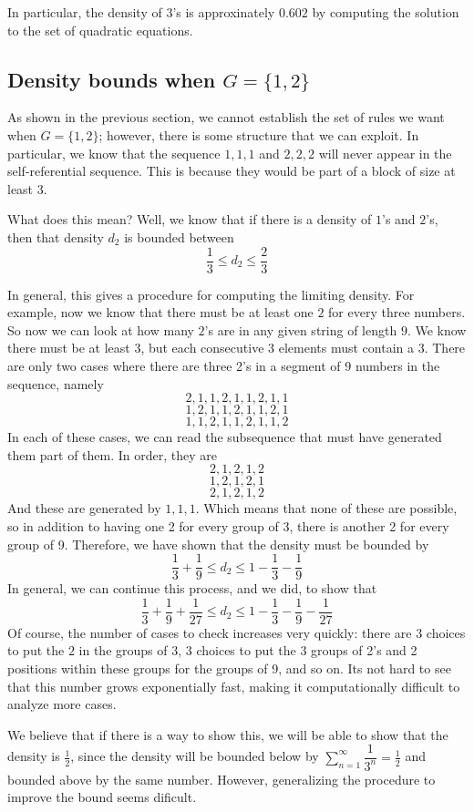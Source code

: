 \documentclass[runningheads,a4paper]{llncs}
\begin{document}
In particular, the density of 3's is approxinately $0.602$ by computing the solution to the set of quadratic equations.

\subsection{Density bounds when $G = \{1, 2\}$}

As shown in the previous section, we cannot establish the set of rules we want when $G = \{1 , 2\}$; however, there is some structure that we can exploit. In particular, we know that the sequence $1, 1, 1$ and $2, 2, 2$ will never appear in the self-referential sequence. This is because they would be part of a block of size at least $3$. 

What does this mean? Well, we know that if there is a density of $1$'s and $2$'s, then that density $d_2$ is bounded between 
\[ \dfrac{1}{3} \leq d_2 \leq \dfrac{2}{3} \]

In general, this gives a procedure for computing the limiting density. For example, now we know that there must be at least one $2$ for every three numbers. So now we can look at how many $2$'s are in any given string of length $9$. We know there must be at least $3$, but each consecutive $3$ elements must contain a $3$. There are only two cases where there are three 2's in a segment of $9$ numbers in the sequence, namely
\[ 2, 1, 1, 2, 1, 1 ,2 , 1, 1 \]
\[ 1, 2, 1, 1, 2, 1, 1, 2, 1 \]
\[ 1, 1, 2, 1, 1, 2, 1, 1, 2 \]
In each of these cases, we can read the subsequence that must have generated them part of them. In order, they are
\[ 2, 1, 2, 1, 2 \]
\[ 1, 2, 1, 2, 1\]
\[ 2, 1, 2, 1, 2 \]
And these are generated by $1, 1, 1$. Which means that none of these are possible, so in addition to having one 2 for every group of 3, there is another 2 for every group of 9. Therefore, we have shown that the density must be bounded by
\[ \dfrac{1}{3} + \dfrac{1}{9} \leq d_2 \leq 1 - \dfrac{1}{3} - \dfrac{1}{9} \]
In general, we can continue this process, and we did, to show that
\[ \dfrac{1}{3} + \dfrac{1}{9} + \dfrac{1}{27} \leq d_2 \leq 1 - \dfrac{1}{3} - \dfrac{1}{9} - \dfrac{1}{27} \]
Of course, the number of cases to check increases very quickly: there are $3$ choices to put the $2$ in the groups of $3$, $3$ choices to put the 3 groups of 2's and 2 positions within these groups for the groups of 9, and so on. Its not hard to see that this number grows exponentially fast, making it computationally difficult to analyze more cases.

We believe that if there is a way to show this, we will be able to show that the density is $\frac{1}{2}$, since the density will be bounded below by $\sum_{n=1}^\infty \dfrac{1}{3^n} = \frac{1}{2}$ and bounded above by the same number. However, generalizing the procedure to improve the bound seems dificult.   
\end{document}
